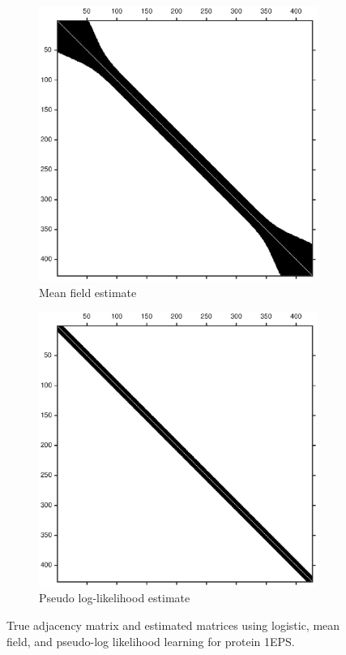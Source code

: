 \documentclass{article}
\begin{document}
\begin{figure}
\begin{subfigure}{0.45\textwidth}
\includegraphics[width=\linewidth]{paper_images/mf_adj.eps}
\caption{Mean field estimate}
\label{fig:mf_adj}
\end{subfigure}
\begin{subfigure}{0.45\textwidth}
\includegraphics[width=\linewidth]{paper_images/pll_adj.eps}
\caption{Pseudo log-likelihood estimate}
\label{fig:pll_adj}
\end{subfigure}
\caption{True adjacency matrix and estimated matrices using logistic, mean field, and pseudo-log likelihood learning for protein 1EPS.}
\label{fig:adjacency_estimate}
\end{figure}
\end{document}
